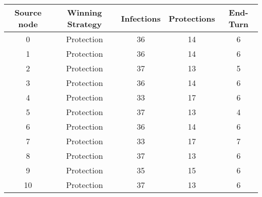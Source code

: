\documentclass[results.tex]{subfiles}
\begin{document}
    \begin{center}
        \begin{tabular}{| c || c | c | c | c |}
            \hline
            {\bfseries Source node} & {\bfseries Winning Strategy} & {\bfseries Infections} & {\bfseries Protections}
            & {\bfseries End-Turn}
            \\  %
            \hline\hline
            0                       & Protection                   & 36                     & 14                      & 6                    \\
            \hline
            1                       & Protection                   & 36                     & 14                      & 6                    \\
            \hline
            2                       & Protection                   & 37                     & 13                      & 5                    \\
            \hline
            3                       & Protection                   & 36                     & 14                      & 6                    \\
            \hline
            4                       & Protection                   & 33                     & 17                      & 6                    \\
            \hline
            5                       & Protection                   & 37                     & 13                      & 4                    \\
            \hline
            6                       & Protection                   & 36                     & 14                      & 6                    \\
            \hline
            7                       & Protection                   & 33                     & 17                      & 7                    \\
            \hline
            8                       & Protection                   & 37                     & 13                      & 6                    \\
            \hline
            9                       & Protection                   & 35                     & 15                      & 6                    \\
            \hline
            10                      & Protection                   & 37                     & 13                      & 6                    \\

\end{tabular}
\end{center}
\end{document}

